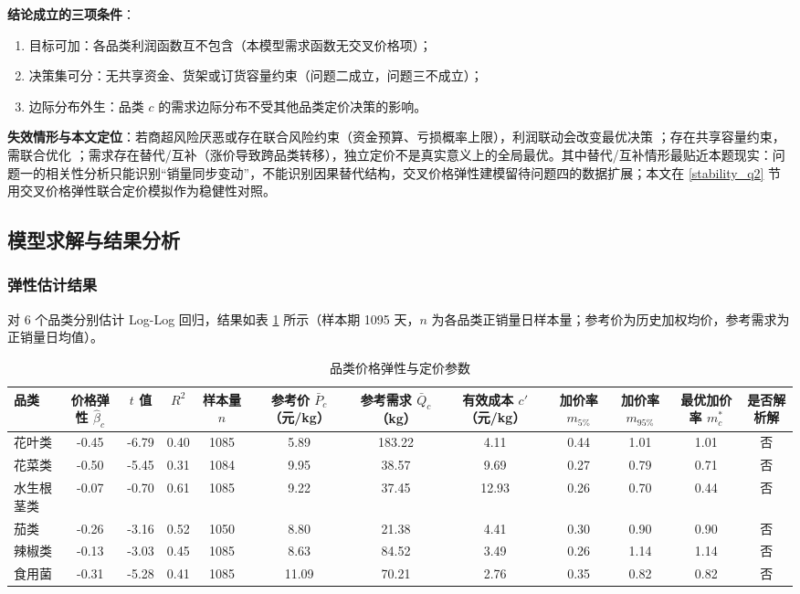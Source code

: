 \textbf{结论成立的三项条件}：
\begin{enumerate}
\item 目标可加：各品类利润函数互不包含（本模型需求函数无交叉价格项）；
\item 决策集可分：无共享资金、货架或订货容量约束（问题二成立，问题三不成立）；
\item 边际分布外生：品类 $c$ 的需求边际分布不受其他品类定价决策的影响。
\end{enumerate}

\textbf{失效情形与本文定位}：若商超风险厌恶或存在联合风险约束（资金预算、亏损概率上限），利润联动会改变最优决策 \cite{chen2009}；存在共享容量约束，需联合优化 \cite{abdelmalek2004}；需求存在替代/互补（涨价导致跨品类转移），独立定价不是真实意义上的全局最优。其中替代/互补情形最贴近本题现实：问题一的相关性分析只能识别“销量同步变动”，不能识别因果替代结构，交叉价格弹性建模留待问题四的数据扩展；本文在 \ref{stability_q2} 节用交叉价格弹性联合定价模拟作为稳健性对照。


\subsection{模型求解与结果分析}
\label{sec:result}

\subsubsection{弹性估计结果}

对 6 个品类分别估计 Log-Log 回归，结果如表 \ref{tab:q2_elasticity} 所示（样本期 1095 天，$n$ 为各品类正销量日样本量；参考价为历史加权均价，参考需求为正销量日均值）。

\begin{table}[htbp]
\centering
\caption{品类价格弹性与定价参数}
\label{tab:q2_elasticity}
\begin{tabular}{lccccccccccc}
\toprule
品类 & 价格弹性 $\hat\beta_c$ & $t$ 值 & $R^2$ & 样本量 $n$ & 参考价 $\bar P_c$（元/kg） & 参考需求 $\bar Q_c$（kg） & 有效成本 $c'$（元/kg） & 加价率 $m_{5\%}$ & 加价率 $m_{95\%}$ & 最优加价率 $m^*_c$ & 是否解析解 \\
\midrule
花叶类 & -0.45 & -6.79 & 0.40 & 1085 & 5.89 & 183.22 & 4.11 & 0.44 & 1.01 & 1.01 & 否 \\
花菜类 & -0.50 & -5.45 & 0.31 & 1084 & 9.95 & 38.57 & 9.69 & 0.27 & 0.79 & 0.71 & 否 \\
水生根茎类 & -0.07 & -0.70 & 0.61 & 1085 & 9.22 & 37.45 & 12.93 & 0.26 & 0.70 & 0.44 & 否 \\
茄类 & -0.26 & -3.16 & 0.52 & 1050 & 8.80 & 21.38 & 4.41 & 0.30 & 0.90 & 0.90 & 否 \\
辣椒类 & -0.13 & -3.03 & 0.45 & 1085 & 8.63 & 84.52 & 3.49 & 0.26 & 1.14 & 1.14 & 否 \\
食用菌 & -0.31 & -5.28 & 0.41 & 1085 & 11.09 & 70.21 & 2.76 & 0.35 & 0.82 & 0.82 & 否 \\
\bottomrule
\end{tabular}
\end{table}

